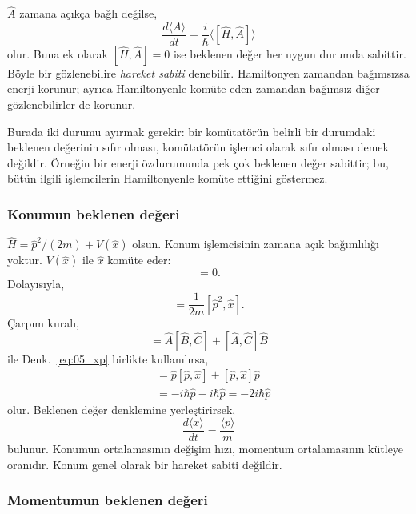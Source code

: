 $\hat A$ zamana açıkça bağlı değilse,
\begin{equation}
 \frac{d\langle A\rangle}{dt}
 =\frac{i}{\hbar}\langle[\hat H,\hat A]\rangle
\end{equation}
olur. Buna ek olarak $[\hat H,\hat A]=0$ ise beklenen değer her
uygun durumda sabittir. Böyle bir gözlenebilire \emph{hareket sabiti}
denebilir. Hamiltonyen zamandan bağımsızsa enerji korunur; ayrıca
Hamiltonyenle komüte eden zamandan bağımsız diğer gözlenebilirler
de korunur.

Burada iki durumu ayırmak gerekir: bir komütatörün belirli bir
durumdaki beklenen değerinin sıfır olması, komütatörün işlemci olarak
sıfır olması demek değildir. Örneğin bir enerji özdurumunda pek çok
beklenen değer sabittir; bu, bütün ilgili işlemcilerin Hamiltonyenle
komüte ettiğini göstermez.

\subsubsection{Konumun beklenen değeri}

$\hat H=\hat p^2/(2m)+V(\hat x)$ olsun. Konum işlemcisinin zamana
açık bağımlılığı yoktur. $V(\hat x)$ ile $\hat x$ komüte eder:
\begin{equation}
 [V(\hat x),\hat x]=0.
\end{equation}
Dolayısıyla,
\begin{equation}
 [\hat H,\hat x]=\frac{1}{2m}[\hat p^2,\hat x].
\end{equation}
Çarpım kuralı,
\begin{equation}
 [\hat A\hat B,\hat C]
 =\hat A[\hat B,\hat C]+[\hat A,\hat C]\hat B
\end{equation}
ile Denk.~\eqref{eq:05_xp} birlikte kullanılırsa,
\begin{align}
 [\hat p^2,\hat x]
 &=\hat p[\hat p,\hat x]+[\hat p,\hat x]\hat p\\
 &=-i\hbar\hat p-i\hbar\hat p=-2i\hbar\hat p
\end{align}
olur. Beklenen değer denklemine yerleştirirsek,
\begin{equation}
 \boxed{\frac{d\langle x\rangle}{dt}
       =\frac{\langle p\rangle}{m}}
 \label{eq:05_ehrenfest_x}
\end{equation}
bulunur. Konumun ortalamasının değişim hızı, momentum ortalamasının
kütleye oranıdır. Konum genel olarak bir hareket sabiti değildir.

\subsubsection{Momentumun beklenen değeri}

